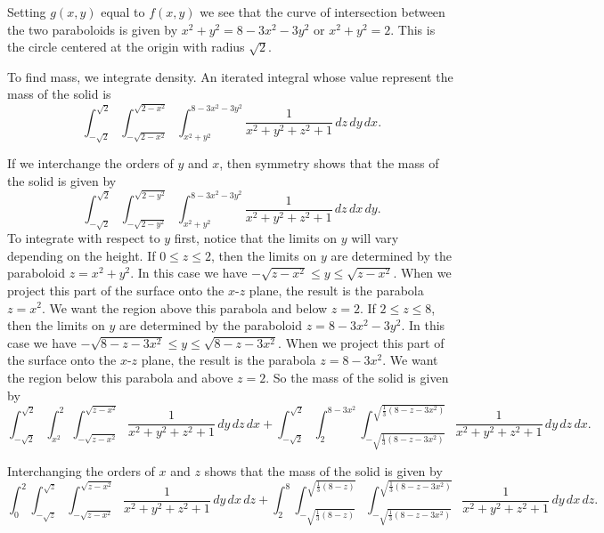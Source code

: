 \begin{exercises}
\begin{exerciseSolution}
	\ba
		\item Setting $g(x,y)$ equal to $f(x,y)$ we see that the curve of intersection between the two paraboloids is given by $x^2+y^2 = 8-3x^2-3y^2$ or $x^2+y^2=2$. This is the circle centered at the origin with radius $\sqrt{2}$. 
		\item To find mass, we integrate density. An iterated integral whose value represent the mass of the solid is
\[\int_{-\sqrt{2}}^{\sqrt{2}} \int_{-\sqrt{2-x^2}}^{\sqrt{2-x^2}} \int_{x^2+y^2}^{8-3x^2-3y^2} \frac{1}{x^2 + y^2 + z^2 + 1} \, dz \, dy \, dx.\]
		\item If we interchange the orders of $y$ and $x$, then symmetry shows that the mass of the solid is given by 
\[\int_{-\sqrt{2}}^{\sqrt{2}} \int_{-\sqrt{2-y^2}}^{\sqrt{2-y^2}} \int_{x^2+y^2}^{8-3x^2-3y^2} \frac{1}{x^2 + y^2 + z^2 + 1} \, dz \, dx \, dy.\]
To integrate with respect to $y$ first, notice that the limits on $y$ will vary depending on the height. If $0 \leq z \leq 2$, then the limits on $y$ are determined by the paraboloid $z = x^2+y^2$. In this case we have $-\sqrt{z-x^2} \leq y \leq \sqrt{z-x^2}$. When we project this part of the surface onto the $x$-$z$ plane, the result is the parabola $z=x^2$. We want the region above this parabola and below $z=2$. If $2 \leq z \leq 8$, then the limits on $y$ are determined by the paraboloid $z = 8-3x^2-3y^2$. In this case we have $-\sqrt{8-z-3x^2} \leq y \leq \sqrt{8-z-3x^2}$. When we project this part of the surface onto the $x$-$z$ plane, the result is the parabola $z=8-3x^2$. We want the region below this parabola and above $z=2$. So the mass of the solid is given by 
\[\int_{-\sqrt{2}}^{\sqrt{2}} \int_{x^2}^{2} \int_{-\sqrt{z-x^2}}^{\sqrt{z-x^2}} \frac{1}{x^2 + y^2 + z^2 + 1} \, dy \, dz \, dx + \int_{-\sqrt{2}}^{\sqrt{2}} \int_{2}^{8-3x^2} \int_{-\sqrt{\frac{1}{3}(8-z-3x^2)}}^{\sqrt{\frac{1}{3}(8-z-3x^2)}} \frac{1}{x^2 + y^2 + z^2 + 1} \, dy \, dz \, dx .\]


Interchanging the orders of $x$ and $z$ shows that the mass of the solid is given by 
\[\int_{0}^{2} \int_{-\sqrt{z}}^{\sqrt{z}} \int_{-\sqrt{z-x^2}}^{\sqrt{z-x^2}} \frac{1}{x^2 + y^2 + z^2 + 1} \, dy \, dx \, dz + \int_{2}^{8} \int_{-\sqrt{\frac{1}{3}(8-z)}}^{\sqrt{\frac{1}{3}(8-z)}} \int_{-\sqrt{\frac{1}{3}(8-z-3x^2)}}^{\sqrt{\frac{1}{3}(8-z-3x^2)}} \frac{1}{x^2 + y^2 + z^2 + 1} \, dy \, dx \, dz .\]


\end{exerciseSolution}
\end{exercises}
